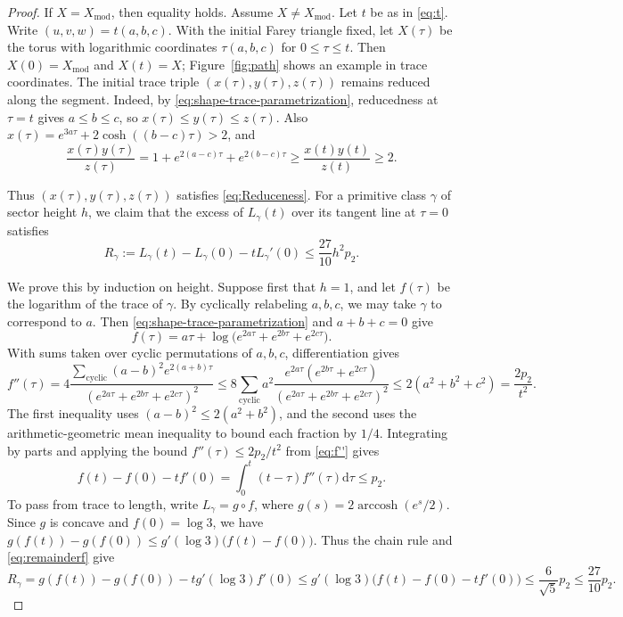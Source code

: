 \documentclass[10pt,twoside]{article}
\theoremstyle{plain}
\theoremstyle{definition}
\theoremstyle{remark}
\DeclareMathOperator{\arccosh}{arccosh}
\newcommand{\Xmod}{X_{\mathrm{mod}}}
\begin{document}
\begin{proof}
If $X=\Xmod$, then equality holds. Assume $X\ne\Xmod$.
Let $t$ be as in \eqref{eq:t}. Write $(u,v,w)=t(a,b,c)$. With the
initial Farey triangle fixed, let $X(\tau)$ be the torus with
logarithmic coordinates $\tau(a,b,c)$ for $0\leq\tau\leq t$.
Then $X(0)=\Xmod$ and $X(t)=X$; Figure~\ref{fig:path} shows an
example in trace coordinates. The initial trace triple
$(x(\tau), y(\tau),z(\tau))$ remains reduced along the segment. Indeed, by
\eqref{eq:shape-trace-parametrization}, reducedness at $\tau=t$
gives $a\leq b\leq c$, so $x(\tau)\leq y(\tau)\leq z(\tau)$.
Also $x(\tau)=e^{3a\tau}+2\cosh((b-c)\tau)>2$, and 
$$
\frac{x(\tau)y(\tau)}{z(\tau)}
=1+e^{2(a-c)\tau}+e^{2(b-c)\tau}
\geq \frac{x(t)y(t)}{z(t)}\geq 2.
$$

Thus $(x(\tau), y(\tau),z(\tau))$ satisfies \eqref{eq:Reduceness}.
For a primitive class $\gamma$ of sector height $h$, we claim that
the excess of $L_\gamma(t)$ over its tangent line at $\tau=0$
satisfies
\begin{equation}
\label{eq:length-tangent-remainder}
R_\gamma:=L_\gamma(t)-L_\gamma(0)-tL_\gamma'(0)
\leq\frac{27}{10}h^2p_2.
\end{equation}

We prove this by induction on height. Suppose first that $h=1$,
and let $f(\tau)$ be the logarithm of the trace of $\gamma$.
By cyclically relabeling $a,b,c$, we may take $\gamma$ to
correspond to $a$. Then \eqref{eq:shape-trace-parametrization} and
$a+b+c=0$ give
$$
f(\tau)=a\tau+\log\bigl(e^{2a\tau}+e^{2b\tau}+e^{2c\tau}\bigr).
$$
With sums taken over cyclic permutations of $a,b,c$, differentiation gives
\begin{equation}
\label{eq:f''}
f''(\tau)
=4\frac{\sum_{\mathrm{cyclic}}(a-b)^2e^{2(a+b)\tau}}
           {(e^{2a\tau}+e^{2b\tau}+e^{2c\tau})^2}
\leq 8\sum_{\mathrm{cyclic}}a^2
  \frac{e^{2a\tau}(e^{2b\tau}+e^{2c\tau})}
       {(e^{2a\tau}+e^{2b\tau}+e^{2c\tau})^2}
\leq 2(a^2+b^2+c^2)=\frac{2p_2}{t^2}.
\end{equation}
The first inequality uses $(a-b)^2\leq 2(a^2+b^2)$, and the second
uses the arithmetic-geometric mean inequality to bound each
fraction by $1/4$.
Integrating by parts and applying the bound
$f''(\tau)\leq 2p_2/t^2$ from \eqref{eq:f''} gives
\begin{equation}\label{eq:remainderf}
  f(t)-f(0)-tf'(0)
=\int_0^t(t-\tau)f''(\tau)\mathrm{d}\tau
\leq p_2.  
\end{equation}
To pass from trace to length, write $L_\gamma=g\circ f$, where
$g(s)=2\arccosh(e^s/2)$. Since $g$ is concave and $f(0)=\log 3$, we have
$
g(f(t))-g(f(0))\leq g'(\log 3)\bigl(f(t)-f(0)\bigr).
$
Thus the chain rule and \eqref{eq:remainderf} give
$$
R_\gamma
=g(f(t))-g(f(0))-tg'(\log 3)f'(0)\leq g'(\log 3)\bigl(f(t)-f(0)-tf'(0)\bigr)\leq \frac{6}{\sqrt{5}}p_2
\leq \frac{27}{10}p_2.
$$


\end{proof}
\end{document}
